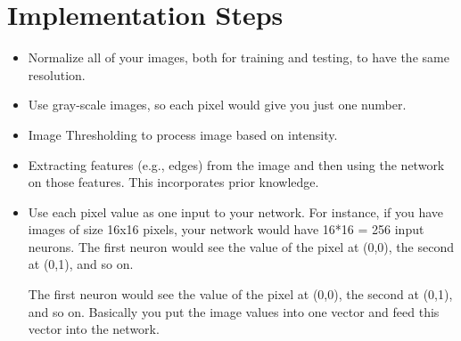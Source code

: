 \documentclass[a4paper,11pt]{article}
\theoremstyle{mytheor}
\begin{document}
\clearpage

\section{Implementation Steps}

\begin{itemize}
	
	\item Normalize all of your images, both for training and testing, to have the same resolution.
	
	\item Use gray-scale images, so each pixel would give you just one number.
	
	\item Image Thresholding to process image based on intensity.
	
	\item Extracting features (e.g., edges) from the image and then using the network on those features. This incorporates prior knowledge.
	
	\item Use each pixel value as one input to your network. For instance, if you have images of size 16x16 pixels, your network would have 16*16 = 256 input neurons. The first neuron would see the value of the pixel at (0,0), the second at (0,1), and so on.
	\par
	The first neuron would see the value of the pixel at (0,0), the second at (0,1), and so on. Basically you put the image values into one vector and feed this vector into the network. 

\end{itemize}
\end{document}
